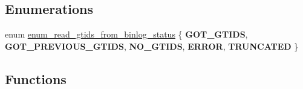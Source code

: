 \subsection*{Enumerations}
\begin{DoxyCompactItemize}
\item 
enum \mbox{\hyperlink{group__Binary__Log_ga1e24693cd278a03ccca7bc269375ad16}{enum\+\_\+read\+\_\+gtids\+\_\+from\+\_\+binlog\+\_\+status}} \{ \newline
{\bfseries G\+O\+T\+\_\+\+G\+T\+I\+DS}, 
{\bfseries G\+O\+T\+\_\+\+P\+R\+E\+V\+I\+O\+U\+S\+\_\+\+G\+T\+I\+DS}, 
{\bfseries N\+O\+\_\+\+G\+T\+I\+DS}, 
{\bfseries E\+R\+R\+OR}, 
\newline
{\bfseries T\+R\+U\+N\+C\+A\+T\+ED}
 \}
\end{DoxyCompactItemize}
\subsection*{Functions}
